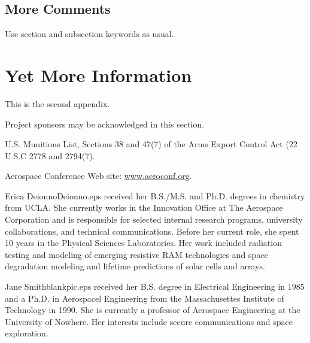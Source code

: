 \documentclass[twocolumn,letterpaper]{IEEEAerospaceCLS}  %
\begin{document}
\subsection{More Comments}
Use section and subsection keywords as usual.

\section{Yet More Information}    %
This is the second appendix.



\acknowledgments
Project sponsors may be acknowledged in this section. 




%
\begin{thebibliography}{1}

U.S. Munitions List, Sections 38 and 47(7) of the Arms Export Control Act (22 U.S.C 2778 and 2794(7).

Aerospace Conference Web site: \underline{www.aeroconf.org}.

\end{thebibliography}


\thebiography
\begin{biographywithpic}
{Erica Deionno}{Deionno.eps}
received her B.S./M.S. and Ph.D. degrees in chemistry from UCLA. She currently works in the Innovation Office at The Aerospace Corporation and is responsible for selected internal research programs, university collaborations, and technical communications. Before her current role, she spent 10 years in the Physical Sciences Laboratories. Her work included radiation testing and modeling of emerging resistive RAM technologies and space degradation modeling and lifetime predictions of solar cells and arrays.
\end{biographywithpic} 

\begin{biographywithpic}
{Jane Smith}{blankpic.eps}
received her B.S. degree in Electrical Engineering in 1985 and a Ph.D. in Aerospacel Engineering from the Massachusettes Institute of Technology in 1990. She is currently a professor of Aerospace Engineering at the University of Nowhere. Her interests include secure communications and space exploration.

\end{biographywithpic}
\end{document}
